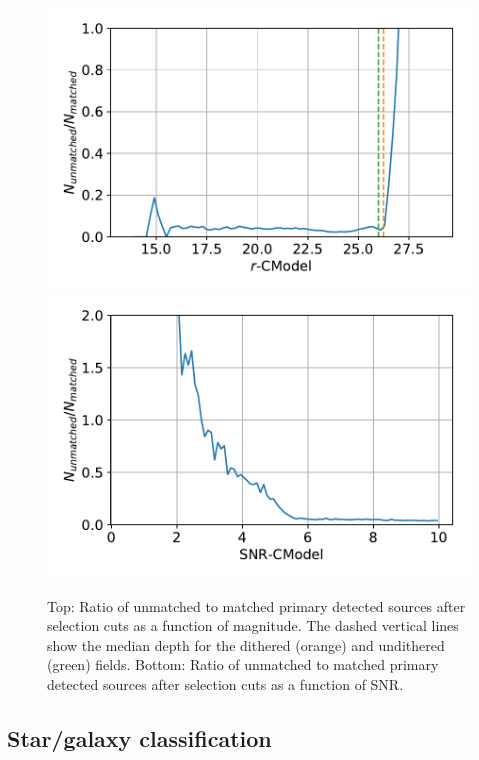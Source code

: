 \documentclass[\docopts]{\docclass}
\begin{document}
\begin{figure}
\centering
\includegraphics[width=0.9\columnwidth]{unmatched_fraction_magnitude.pdf}
\includegraphics[width=0.9\columnwidth]{unmatched_fraction_SNR.pdf}
\caption{Top: Ratio of unmatched to matched primary detected sources after selection cuts as a function of magnitude. The dashed vertical lines show the median depth for the dithered (orange) and undithered (green) fields. Bottom: Ratio of unmatched to matched primary detected sources after selection cuts as a function of SNR.}
\label{fig:snr_mag_selection}
\end{figure}

\subsection{Star/galaxy classification}
\end{document}
